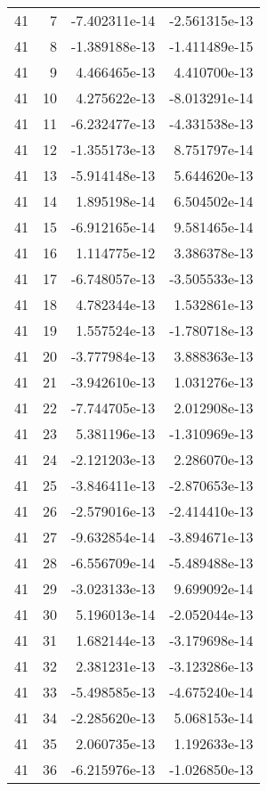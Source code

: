 \begin{tabular}{rrrr}
  41 &    7 & -7.402311e-14 & -2.561315e-13 \\
  41 &    8 & -1.389188e-13 & -1.411489e-15 \\
  41 &    9 &  4.466465e-13 &  4.410700e-13 \\
  41 &   10 &  4.275622e-13 & -8.013291e-14 \\
  41 &   11 & -6.232477e-13 & -4.331538e-13 \\
  41 &   12 & -1.355173e-13 &  8.751797e-14 \\
  41 &   13 & -5.914148e-13 &  5.644620e-13 \\
  41 &   14 &  1.895198e-14 &  6.504502e-14 \\
  41 &   15 & -6.912165e-14 &  9.581465e-14 \\
  41 &   16 &  1.114775e-12 &  3.386378e-13 \\
  41 &   17 & -6.748057e-13 & -3.505533e-13 \\
  41 &   18 &  4.782344e-13 &  1.532861e-13 \\
  41 &   19 &  1.557524e-13 & -1.780718e-13 \\
  41 &   20 & -3.777984e-13 &  3.888363e-13 \\
  41 &   21 & -3.942610e-13 &  1.031276e-13 \\
  41 &   22 & -7.744705e-13 &  2.012908e-13 \\
  41 &   23 &  5.381196e-13 & -1.310969e-13 \\
  41 &   24 & -2.121203e-13 &  2.286070e-13 \\
  41 &   25 & -3.846411e-13 & -2.870653e-13 \\
  41 &   26 & -2.579016e-13 & -2.414410e-13 \\
  41 &   27 & -9.632854e-14 & -3.894671e-13 \\
  41 &   28 & -6.556709e-14 & -5.489488e-13 \\
  41 &   29 & -3.023133e-13 &  9.699092e-14 \\
  41 &   30 &  5.196013e-14 & -2.052044e-13 \\
  41 &   31 &  1.682144e-13 & -3.179698e-14 \\
  41 &   32 &  2.381231e-13 & -3.123286e-13 \\
  41 &   33 & -5.498585e-13 & -4.675240e-14 \\
  41 &   34 & -2.285620e-13 &  5.068153e-14 \\
  41 &   35 &  2.060735e-13 &  1.192633e-13 \\
  41 &   36 & -6.215976e-13 & -1.026850e-13 \\

\end{tabular}
